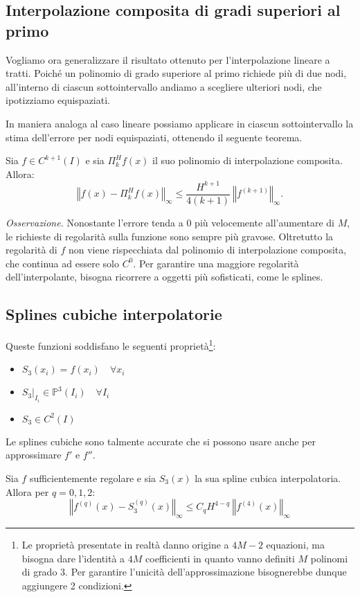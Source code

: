 \subsection{Interpolazione composita di gradi superiori al primo}
Vogliamo ora generalizzare il risultato ottenuto per l'interpolazione lineare a tratti.
Poiché un polinomio di grado superiore al primo richiede più di due nodi, all'interno di ciascun sottointervallo andiamo a scegliere ulteriori nodi, che ipotizziamo equispaziati.

In maniera analoga al caso lineare possiamo applicare in ciascun sottointervallo la stima dell'errore per nodi equispaziati, ottenendo il seguente teorema.

\begin{theorem}
Sia $f\in C^{k+1}(I)$ e sia $\Pi ^{H}_{k} f(x)$ il suo polinomio di interpolazione composita. Allora:
\begin{equation*}
\left\Vert f(x) -\Pi ^{H}_{k} f(x)\right\Vert _{\infty } \leqslant \frac{H^{k+1}}{4(k+1)} \ \left\Vert f^{( k+1)}\right\Vert _{\infty }.
\end{equation*}
\end{theorem}
\textit{Osservazione.}
Nonostante l'errore tenda a $0$ più velocemente all'aumentare di $M$, le richieste di regolarità sulla funzione sono sempre più gravose. Oltretutto la regolarità di $f$ non viene rispecchiata dal polinomio di interpolazione composita, che continua ad essere solo $C^0$. Per garantire una maggiore regolarità dell'interpolante, bisogna ricorrere a oggetti più sofisticati, come le splines.

\subsection{Splines cubiche interpolatorie}
Queste funzioni soddisfano le seguenti proprietà\footnote{
Le proprietà presentate in realtà danno origine a $4M-2$ equazioni, ma bisogna dare l'identità a $4 M$ coefficienti in quanto vanno definiti $M$ polinomi di grado $3$. Per garantire l'unicità dell'approssimazione bisognerebbe dunque aggiungere 2 condizioni.}:
\begin{itemize}
    \item $S_3(x_i)=f(x_i)\quad \forall x_i$
    \item $S_3|_{I_i}\in \mathbb P^3(I_i)\quad \forall I_ i$
    \item $S_3\in C^2(I)$
\end{itemize}

Le splines cubiche sono talmente accurate che si possono usare anche per approssimare $f'$ e $f''$.
\begin{theorem}
Sia $f$ sufficientemente regolare e sia $S_3(x)$ la sua spline cubica interpolatoria. Allora per $q=0,1,2$:
\begin{equation*}
\left\Vert f^{(q)}(x) -S_3^{(q)}(x)\right\Vert _{\infty } \leqslant C_q H^{4-q} \ \left\Vert f^{(4)}(x)\right\Vert _{\infty }
\end{equation*}
\end{theorem}


